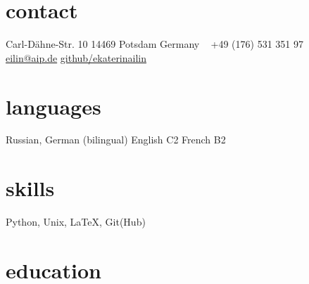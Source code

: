 \documentclass[]{k-cv} %
\begin{document}

\begin{aside} 
\color{gray}
\section{contact}
Carl-D\"ahne-Str. 10
14469 Potsdam
Germany
~
+49 (176) 531 351 97
~
\href{mailto:eilin@aip.de}{eilin@aip.de}
\href{https://github.com/ekaterinailin}{github/ekaterinailin}
\section{languages}
Russian, German (bilingual)
English C2
French B2
\section{skills}
Python, Unix, LaTeX, Git(Hub)
\end{aside}


\section{education}
\end{document}
